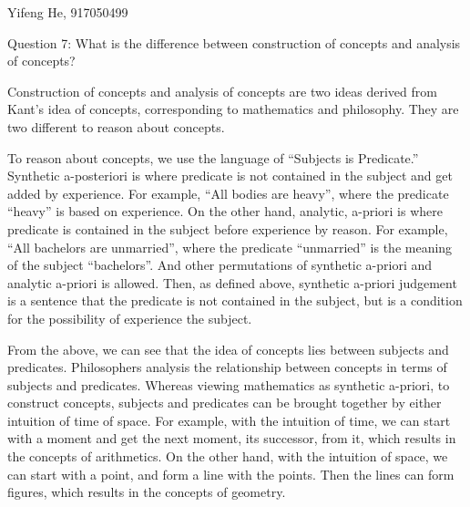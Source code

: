 \documentclass[11pt]{article}
\begin{document}
\begin{center}
    Yifeng He, 917050499
\end{center}

\begin{center}
    Question 7:
    What is the difference between construction of concepts and analysis of concepts?
\end{center}

Construction of concepts and analysis of concepts are two ideas derived from Kant's idea of concepts,
corresponding to mathematics and philosophy.
They are two different to reason about concepts.

To reason about concepts, we use the language of ``Subjects is Predicate.''
Synthetic a-posteriori is where predicate is not contained in the subject and get added by experience.
For example, ``All bodies are heavy'',
where the predicate ``heavy'' is based on experience.
On the other hand,
analytic, a-priori is where predicate is contained in the subject before experience by reason.
For example, ``All bachelors are unmarried'',
where the predicate ``unmarried'' is the meaning of the subject ``bachelors''.
And other permutations of synthetic a-priori and analytic a-priori is allowed.
Then, as defined above,
synthetic a-priori judgement is a sentence that
the predicate is not contained in the subject,
but is a condition for the possibility of experience the subject.

From the above, we can see that the idea of concepts lies between subjects and predicates.
Philosophers analysis the relationship between concepts in terms of subjects and predicates.
Whereas viewing mathematics as synthetic a-priori,
to construct concepts, subjects and predicates can be brought together by either intuition of time of space.
For example, with the intuition of time,
we can start with a moment and get the next moment, its successor, from it,
which results in the concepts of arithmetics.
On the other hand, with the intuition of space,
we can start with a point, and form a line with the points.
Then the lines can form figures, which results in the concepts of geometry.
\end{document}
